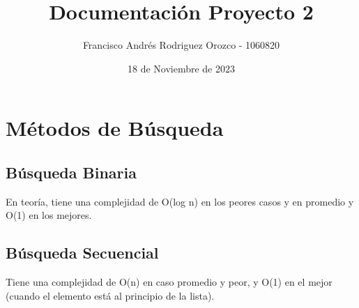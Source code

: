 \documentclass[11pt]{article}
\author{Francisco Andrés Rodriguez Orozco - 1060820}
\date{18 de Noviembre de 2023}
\title{Documentación Proyecto 2}
\begin{document}
\maketitle
\tableofcontents


\section{Métodos de Búsqueda}
\label{sec:org34458a0}
\subsection{Búsqueda Binaria}
\label{sec:orgbbbed09}
En teoría, tiene una complejidad de O(log n) en los peores casos y en promedio y O(1) en los mejores.
\subsection{Búsqueda Secuencial}
\label{sec:orga66867e}
Tiene una complejidad de O(n) en caso promedio y peor, y O(1) en el mejor (cuando el elemento está al principio de la lista).
\end{document}
